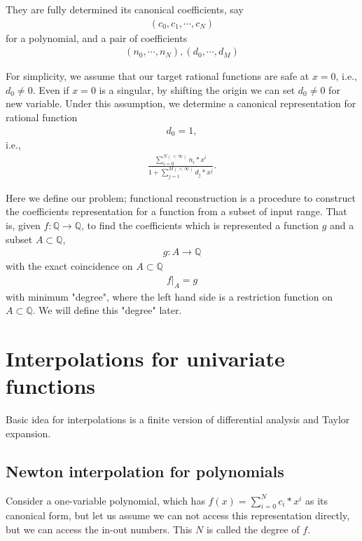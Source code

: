 \documentclass[11pt]{book}
\begin{document}
They are fully determined its canonical coefficients, say
\begin{eqnarray}
(c_0, c_1, \cdots, c_N)
\end{eqnarray}
for a polynomial, and a pair of coefficients
\begin{eqnarray}
(n_0, \cdots, n_N), (d_0, \cdots, d_M)
\end{eqnarray}

For simplicity, we assume that our target rational functions are safe at $x=0$, i.e., $d_0 \neq 0$.
Even if $x=0$ is a singular, by shifting the origin we can set $d_0 \neq 0$ for new variable.
Under this assumption, we determine a canonical representation for rational function
\begin{eqnarray}
d_0 = 1,
\end{eqnarray}
i.e.,
\begin{eqnarray}
\frac{\sum_{i=0}^{N (<\infty)} n_i * x^i}{1+ \sum_{j=1}^{M (<\infty)} d_j * x^j}.
\end{eqnarray}

Here we define our problem; functional reconstruction is a procedure to construct the coefficients representation for a function from a subset of input range.
That is, given $f : \mathbb{Q} \to \mathbb{Q}$, to find the coefficients which is represented a function $g$ and a subset $A \subset \mathbb{Q}$,
\begin{eqnarray}
g : A \to \mathbb{Q}
\end{eqnarray}
with the exact coincidence on $A \subset \mathbb{Q}$
\begin{eqnarray}
\left. f \right|_{A} = g
\end{eqnarray}
with minimum "degree", where the left hand side is a restriction function on $A \subset \mathbb{Q}$.
We will define this "degree" later.

\section{Interpolations for univariate functions}
Basic idea for interpolations is a finite version of differential analysis and Taylor expansion.

\subsection{Newton interpolation for polynomials}
Consider a one-variable polynomial, which has $ f(x) = \sum_{i=0}^{N} c_i * x^i $ as its canonical form, but let us assume we can not access this representation directly, but we can access the in-out numbers.
This $N$ is called the degree of $f$.
\end{document}
